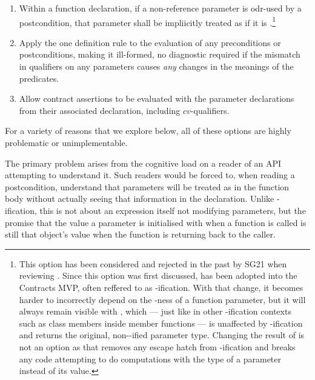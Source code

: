 \begin{enumerate}
\item Within a function declaration, if a non-reference parameter is odr-used by a postcondition, that parameter shall be impliicitly treated as if it is .\footnote{This option has been considered and rejected in the past by SG21 when reviewing \cite{P2829R0}. Since this option was first discussed, \cite{P3071R1} has been adopted into the Contracts MVP, often reffered to as -ification.   With that change, it becomes harder to incorrectly depend on the -ness of a function parameter, but it will always remain visible with , which --- just like in other -ification contexts such as class members inside  member functions --- is unaffected by -ification and returns the original, non--ified parameter type.  Changing the result of  is not an option as that removes any escape hatch from -ification and breaks any code attempting to do computations with the type of a parameter instead of its value.}

\item Apply the one definition rule to the evaluation of any preconditions or postconditions, making it ill-formed, no diagnostic required if the mismatch in  qualifiers on any parameters causes \emph{any} changes in the meanings of the predicates.
\item Allow contract assertions to be evaluated with the parameter declarations from their associated declaration, including $cv$-qualifiers.
\end{enumerate}
       
For a variety of reasons that we explore below, all of these options are highly problematic or unimplementable.

The primary problem arises from the cognitive load on a reader of an API attempting to understand it.  Such readers would be forced to, when reading a postcondition, understand that parameters will be treated as  in the function body without actually seeing that information in the declaration.  Unlike -ification, this is not about an expression itself not modifying parameters, but the promise that the value a parameter is initialised with when a function is called is still that object's value when the function is returning back to the caller.


